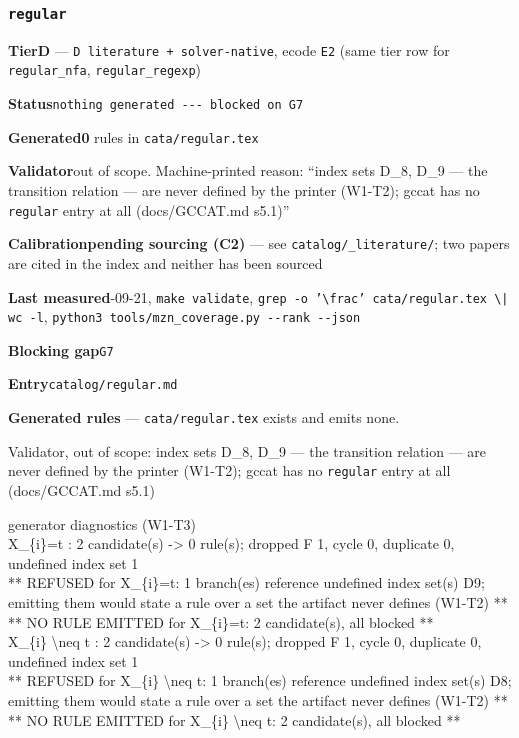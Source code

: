 \documentclass[10pt,a4paper]{article}
\newcommand{\entryfield}[2]{{\raggedright\textbf{#1}\quad #2\par}}
\newcommand{\diag}[1]{{\small\itshape\raggedright #1\par}}
\begin{document}
\subsubsection*{\texttt{regular}}
\label{entry:regular}
\entryfield{Tier}{\textbf{D} --- \texttt{D literature + solver-\allowbreak{}native}, ecode \texttt{E2} (same tier row for \texttt{regular\_nfa}, \texttt{regular\_regexp})}
\entryfield{Status}{\texttt{nothing generated -\allowbreak{}-\allowbreak{}-\allowbreak{} blocked on G7}}
\entryfield{Generated}{\textbf{0} rules in \texttt{cata/regular.tex}}
\entryfield{Validator}{out of scope. Machine-printed reason: ``index sets D\_8, D\_9 --- the transition relation --- are never defined by the printer (W1-T2); gccat has no \texttt{regular} entry at all (docs/GCCAT.md s5.1)''}
\entryfield{Calibration}{\textbf{pending sourcing (C2)} --- see \texttt{catalog/\_literature/}; two papers are cited in the index and neither has been sourced}
\entryfield{Last measured}{2026-09-21, \texttt{make validate}, \texttt{grep -\allowbreak{}o '\textbackslash{}frac' cata/\allowbreak{}regular.\allowbreak{}tex \textbackslash{}| wc -\allowbreak{}l}, \texttt{python3 tools/\allowbreak{}mzn\_\allowbreak{}coverage.\allowbreak{}py -\allowbreak{}-\allowbreak{}rank -\allowbreak{}-\allowbreak{}json}}
\entryfield{Blocking gap}{\texttt{G7}}
\entryfield{Entry}{\texttt{catalog/regular.md}}

\textbf{Generated rules} --- \texttt{cata/regular.tex} exists and emits none.

\diag{Validator, out of scope: index sets D\_8, D\_9 --- the transition relation --- are never defined by the printer (W1-T2); gccat has no \texttt{regular} entry at all (docs/GCCAT.md s5.1)}

\diag{generator diagnostics (W1-T3)\\{} X\_\{i\}=t : 2 candidate(s) -> 0 rule(s); dropped F 1, cycle 0, duplicate 0, undefined index set 1\\{}   ** REFUSED for X\_\{i\}=t: 1 branch(es) reference undefined index set(s) D9; emitting them would state a rule over a set the artifact never defines (W1-T2) **\\{}   ** NO RULE EMITTED for X\_\{i\}=t: 2 candidate(s), all blocked **\\{} X\_\{i\} \textbackslash{}neq t : 2 candidate(s) -> 0 rule(s); dropped F 1, cycle 0, duplicate 0, undefined index set 1\\{}   ** REFUSED for X\_\{i\} \textbackslash{}neq t: 1 branch(es) reference undefined index set(s) D8; emitting them would state a rule over a set the artifact never defines (W1-T2) **\\{}   ** NO RULE EMITTED for X\_\{i\} \textbackslash{}neq t: 2 candidate(s), all blocked **}
\end{document}
